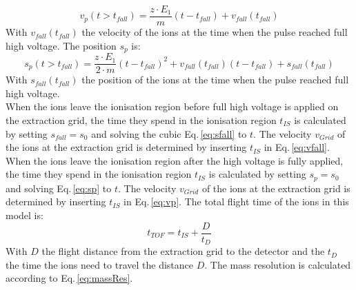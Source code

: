 	\begin{equation}
		v_{p}(t > t_{fall}) = \frac{z\cdot E_1}{m}(t-t_{fall}) + v_{fall}(t_{fall})
		\label{eq:vp}
	\end{equation}
	With $v_{fall}(t_{fall})$ the velocity of the ions at the time when the pulse reached full high voltage. The position $s_{p}$ is:
	\begin{equation}
		s_{p}(t > t_{fall}) = \frac{z\cdot E_1}{2\cdot m}(t-t_{fall})^2 + v_{fall}(t_{fall})(t-t_{fall}) + s_{fall}(t_{fall})
		\label{eq:sp}
	\end{equation}
	With $s_{fall}(t_{fall})$ the position of the ions at the time when the pulse reached full high voltage.\\
	When the ions leave the ionisation region before full high voltage is applied on the extraction grid, the time they spend in the ionisation region $t_{IS}$ is calculated by setting $s_{fall}=s_0$ and solving the cubic Eq.\,\eqref{eq:sfall} to $t$. The velocity $v_{Grid}$ of the ions at the extraction grid is determined by inserting $t_{IS}$ in Eq.\,\eqref{eq:vfall}.\\
	When the ions leave the ionisation region after the high voltage is fully applied, the time they spend in the ionisation region $t_{IS}$ is calculated by setting $s_{p}=s_0$ and solving Eq.\,\eqref{eq:sp} to $t$. The velocity $v_{Grid}$ of the ions at the extraction grid is determined by inserting $t_{IS}$ in Eq.\,\eqref{eq:vp}. The total flight time of the ions in this model is:
	\begin{equation}
		t_{TOF} = t_{IS} +\frac{D}{t_{D}}
	\end{equation}
	With $D$ the flight distance from the extraction grid to the detector and the $t_{D}$ the time the ions need to travel the distance $D$. The mass resolution is calculated according to Eq.\,\eqref{eq:massRes}. %
	
	
	
	
	
	
